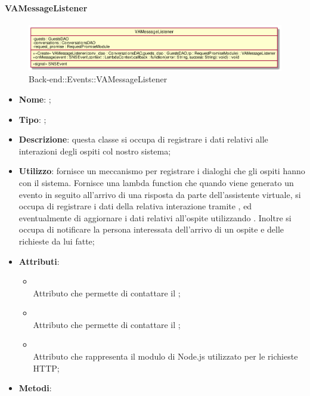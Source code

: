 \hypertarget{VAMessageListener_label}{\paragraph{VAMessageListener}}
\begin{figure}[h]
	\centering
	\includegraphics[width=\textwidth,height=\textheight,keepaspectratio]{images/ClassVAMessageListener.png}
	\caption{Back-end::Events::VAMessageListener}
\end{figure}
\begin{itemize}
	\item \textbf{Nome}: ;
	\item \textbf{Tipo}: ;
	\item \textbf{Descrizione}: questa classe si occupa di registrare i dati relativi alle interazioni degli ospiti col nostro sistema;
	\item \textbf{Utilizzo}: fornisce un meccanismo per registrare i dialoghi che gli ospiti hanno con il sistema. Fornisce una lambda function che quando viene generato un evento  in seguito all'arrivo di una risposta da parte dell'assistente virtuale, si occupa di registrare i dati della relativa interazione tramite , ed eventualmente di aggiornare i dati relativi all'ospite utilizzando . Inoltre si occupa di notificare la persona interessata dell'arrivo di un ospite e delle richieste da lui fatte;
	\item \textbf{Attributi}:
	\begin{itemize}
		\item[]  \\
		Attributo che permette di contattare il ;
		\item[]  \\
		Attributo che permette di contattare il ;
		\item[]  \\
		Attributo che rappresenta il modulo di Node.js utilizzato per le richieste HTTP;
	\end{itemize}
	\item \textbf{Metodi}:

\end{itemize}
